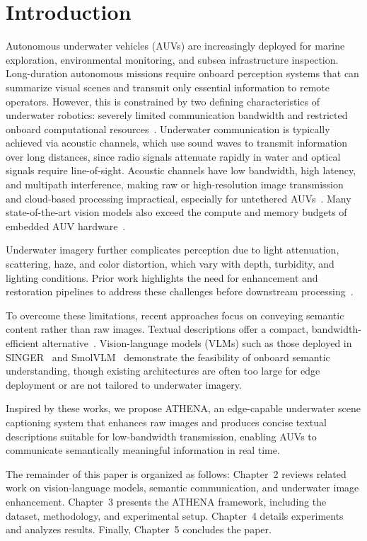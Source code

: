 \chapter{Introduction} \label{sec:intro}
Autonomous underwater vehicles (AUVs) are increasingly deployed for marine exploration, environmental monitoring, and subsea infrastructure inspection. Long-duration autonomous missions require onboard perception systems that can summarize visual scenes and transmit only essential information to remote operators. However, this is constrained by two defining characteristics of underwater robotics: severely limited communication bandwidth and restricted onboard computational resources~\cite{lowbandwith}. Underwater communication is typically achieved via acoustic channels, which use sound waves to transmit information over long distances, since radio signals attenuate rapidly in water and optical signals require line-of-sight. Acoustic channels have low bandwidth, high latency, and multipath interference, making raw or high-resolution image transmission and cloud-based processing impractical, especially for untethered AUVs~\cite{chen1}\cite{li2}\cite{zhang3}. Many state-of-the-art vision models also exceed the compute and memory budgets of embedded AUV hardware~\cite{li2}\cite{marafioti4}.

Underwater imagery further complicates perception due to light attenuation, scattering, haze, and color distortion, which vary with depth, turbidity, and lighting conditions. Prior work highlights the need for enhancement and restoration pipelines to address these challenges before downstream processing~\cite{li2}.

To overcome these limitations, recent approaches focus on conveying semantic content rather than raw images. Textual descriptions offer a compact, bandwidth-efficient alternative~\cite{chen1}\cite{zhang3}. Vision-language models (VLMs) such as those deployed in SINGER~\cite{singer} and SmolVLM~\cite{marafioti4} demonstrate the feasibility of onboard semantic understanding, though existing architectures are often too large for edge deployment or are not tailored to underwater imagery.

Inspired by these works, we propose ATHENA, an edge-capable underwater scene captioning system that enhances raw images and produces concise textual descriptions suitable for low-bandwidth transmission, enabling AUVs to communicate semantically meaningful information in real time.

The remainder of this paper is organized as follows: Chapter~2 reviews related work on vision-language models, semantic communication, and underwater image enhancement. Chapter~3 presents the ATHENA framework, including the dataset, methodology, and experimental setup. Chapter~4 details experiments and analyzes results. Finally, Chapter~5 concludes the paper.

